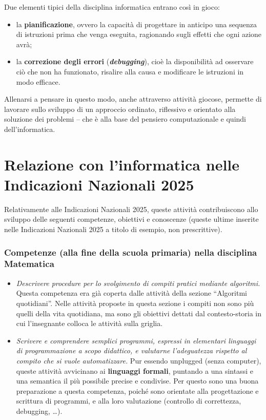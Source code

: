Due elementi tipici della disciplina informatica entrano così in gioco:

\begin{itemize}
\item
  la \textbf{pianificazione}, ovvero la capacità di progettare in anticipo una sequenza di istruzioni prima che venga eseguita, ragionando sugli effetti che ogni azione avrà;
\item
  la \textbf{correzione degli errori} (\emph{\textbf{debugging}}), cioè la disponibilità ad osservare ciò che non ha funzionato, risalire alla causa e modificare le istruzioni in modo efficace.
\end{itemize}

Allenarsi a pensare in questo modo, anche attraverso attività giocose, permette di lavorare sullo sviluppo di un approccio ordinato, riflessivo e orientato alla soluzione dei problemi -- che è alla base del pensiero computazionale e quindi dell'informatica.

\section{Relazione con l'informatica nelle Indicazioni Nazionali 2025 }\label{relazione-con-linformatica-nelle-indicazioni-nazionali-1}

Relativamente alle Indicazioni Nazionali 2025, queste attività contribuiscono allo sviluppo delle seguenti competenze, obiettivi e conoscenze (queste ultime inserite nelle Indicazioni Nazionali 2025 a titolo di esempio, non prescrittive).


\subsubsection{Competenze (alla fine della scuola primaria) nella disciplina Matematica}


\begin{itemize}
\item
  \emph{Descrivere procedure per lo svolgimento di compiti pratici mediante algoritmi.} Questa competenza era già coperta dalle attività della sezione ``Algoritmi quotidiani''. Nelle attività proposte in questa sezione i compiti non sono più quelli della vita quotidiana, ma sono gli obiettivi dettati dal contesto-storia in cui l'insegnante colloca le attività sulla griglia.
\item
  \emph{Scrivere e comprendere semplici programmi, espressi in elementari linguaggi di programmazione a scopo didattico, e valutarne l'adeguatezza rispetto al compito che si vuole automatizzare.} Pur essendo unplugged (senza computer), queste attività avvicinano ai \textbf{linguaggi formali}, puntando a una sintassi e una semantica il più possibile precise e condivise. Per questo sono una buona preparazione a questa competenza, poiché sono orientate alla progettazione e scrittura di programmi, e alla loro valutazione (controllo di correttezza, debugging, \ldots).

\end{itemize}






